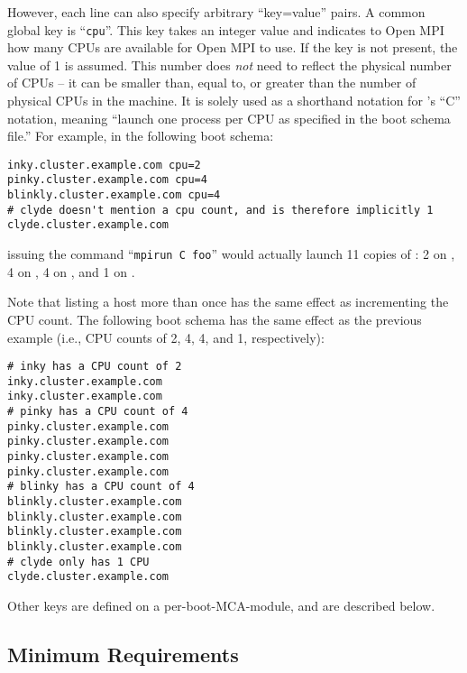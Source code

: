 However, each line can also specify arbitrary ``key=value'' pairs.  A
common global key is ``{\tt cpu}''.  This key takes an integer value
and indicates to Open MPI how many CPUs are available for Open MPI to use.  If
the key is not present, the value of 1 is assumed.  This number does
{\em not} need to reflect the physical number of CPUs -- it can be
smaller than, equal to, or greater than the number of physical CPUs in
the machine.  It is solely used as a shorthand notation for
's ``C'' notation, meaning ``launch one process per CPU
as specified in the boot schema file.''  For example, in the following
boot schema:

\lstset{style=lam-shell}
\begin{lstlisting}
inky.cluster.example.com cpu=2
pinky.cluster.example.com cpu=4
blinkly.cluster.example.com cpu=4
# clyde doesn't mention a cpu count, and is therefore implicitly 1
clyde.cluster.example.com
\end{lstlisting}

\noindent issuing the command ``{\tt mpirun C foo}'' would actually
launch 11 copies of : 2 on , 4 on , 4
on , and 1 on .

Note that listing a host more than once has the same effect as
incrementing the CPU count.  The following boot schema has the same
effect as the previous example (i.e., CPU counts of 2, 4, 4, and 1,
respectively):

\lstset{style=lam-shell}
\begin{lstlisting}
# inky has a CPU count of 2
inky.cluster.example.com
inky.cluster.example.com
# pinky has a CPU count of 4
pinky.cluster.example.com
pinky.cluster.example.com
pinky.cluster.example.com
pinky.cluster.example.com
# blinky has a CPU count of 4
blinkly.cluster.example.com 
blinkly.cluster.example.com 
blinkly.cluster.example.com 
blinkly.cluster.example.com 
# clyde only has 1 CPU
clyde.cluster.example.com
\end{lstlisting}

Other keys are defined on a per-boot-MCA-module, and are described
below.


\subsection{Minimum Requirements}
\label{sec:mca-orte-pls-min-reqs}

